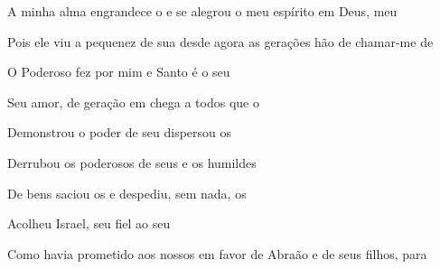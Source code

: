 \begin{greenumerate}
  \item {}A minha alma engrandece o  e se alegrou o meu espírito em Deus, meu 

  \item {}Pois ele viu a pequenez de sua  desde agora as gerações hão de chamar-me de 

  \item {}O Poderoso fez por mim  e Santo é o seu 

  \item {}Seu amor, de geração em  chega a todos que o 

  \item {}Demonstrou o poder de seu  dispersou os 

  \item {}Derrubou os poderosos de seus  e os humildes 

  \item {}De bens saciou os  e despediu, sem nada, os 

  \item {}Acolheu Israel, seu  fiel ao seu 

  \item {}Como havia prometido aos nossos  em favor de Abraão e de seus filhos, para 
\end{greenumerate}